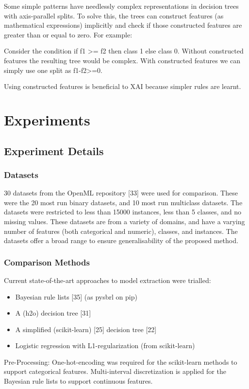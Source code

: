 Some simple patterns have needlessly complex representations in decision trees with axis-parallel splits. To solve this, the trees can construct features (as mathematical expressions) implicitly and check if those constructed features are greater than or equal to zero. For example: 
\begin{center}
Consider the condition if f1 >= f2 then class 1 else class 0. Without constructed features the resulting tree would be complex. With constructed features we can simply use one split as f1-f2>=0.
\end{center}

Using constructed features is beneficial to XAI because simpler rules are learnt.
\section{Experiments}
\subsection{Experiment Details}
\subsubsection{Datasets}
30 datasets from the OpenML repository [33] were used for comparison. These were the 20 most run binary datasets, and 10 most run multiclass datasets. The datasets were restricted to less than 15000 instances, less than 5 classes, and no missing values. These datasets are from a variety of domains, and have a varying number of features (both categorical and numeric), classes, and instances. The datasets offer a broad range to ensure generalisability of the proposed method.
\subsubsection{Comparison Methods}
Current state-of-the-art approaches to model extraction were trialled:
\begin{itemize}
\item Bayesian rule lists [35] (as pysbrl on pip)
\item A (h2o) decision tree [31]
\item A simplified (scikit-learn) [25] decision tree [22]
\item Logistic regression with L1-regularization (from scikit-learn)
\end{itemize}
Pre-Processing: One-hot-encoding was required for the scikit-learn methods to support categorical features. Multi-interval discretization is applied for the Bayesian rule lists to support continuous features.

